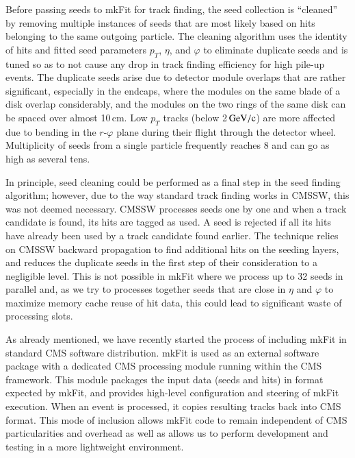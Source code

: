 \documentclass{webofc}
\def\mkfit{mkFit\xspace}
\def\GeVoc{\ensuremath{\,\rm{G}e\rm{V}/c}}
\begin{document}
Before passing seeds to \mkfit for track finding, the seed collection is
``cleaned'' by removing multiple instances of seeds that are most likely 
based on hits belonging to the same outgoing particle. The cleaning
algorithm uses the identity of hits and fitted seed parameters $p_T$, $\eta$,
and $\varphi$ to eliminate duplicate seeds and is tuned so as to not cause any
drop in track finding efficiency for high pile-up events. The duplicate seeds
arise due to detector module overlaps that are rather significant, especially
in the endcaps, where the modules on the same blade of a disk overlap considerably,
and the modules on the two rings of the same disk can be spaced over
almost 10\,cm. Low $p_T$ tracks (below 2\GeVoc) are more affected due to
bending in the $r$-$\varphi$ plane during their flight through the detector
wheel. Multiplicity of seeds from a single particle frequently reaches 8 and
can go as high as several tens.

In principle, seed cleaning could be performed as a final step in the seed
finding algorithm; however, due to the way standard track finding works in
CMSSW, this was not deemed necessary. CMSSW processes seeds one by one and
when a track candidate is found, its hits are tagged as used. A seed is
rejected if all its hits have already been used by a track candidate found
earlier. The technique relies on CMSSW backward propagation to find additional
hits on the seeding layers, and reduces the duplicate seeds in the first step
of their consideration to a negligible level. This is
not possible in \mkfit where we process up to 32 seeds in parallel and, as we
try to processes together seeds that are close in $\eta$ and $\varphi$ to
maximize memory cache reuse of hit data, this could lead to significant waste
of processing slots.

As already mentioned, we have recently started the process of including \mkfit
in standard CMS software distribution. \mkfit is used as an external software
package with a dedicated CMS processing module running within the CMS
framework. This module packages the input data (seeds and hits) in format
expected by \mkfit, and provides high-level configuration and steering of
\mkfit execution. When an event is processed, it copies resulting tracks back
into CMS format. This mode of inclusion allows \mkfit code to remain
independent of CMS particularities and overhead as well as allows us to
perform development and testing in a more lightweight environment.


\end{document}
